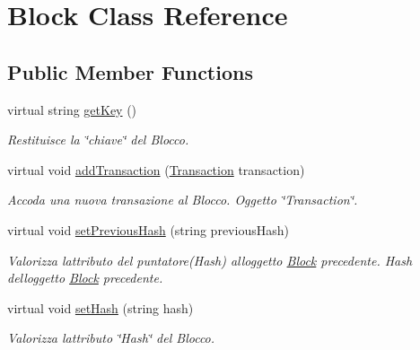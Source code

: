 \hypertarget{class_block}{}\section{Block Class Reference}
\label{class_block}
\subsection*{Public Member Functions}
\begin{DoxyCompactItemize}
\item 
virtual string \mbox{\hyperlink{class_block_ab2a9d794f7f9ee273c5dafe349dfc8ef}{get\+Key}} ()
\begin{DoxyCompactList}\small\item\em Restituisce la \char`\"{}chiave\char`\"{} del Blocco. \end{DoxyCompactList}\item 
\mbox{\label{class_block_aceac7c0fb82807837b429bc004418cc2}} 
virtual void \mbox{\hyperlink{class_block_aceac7c0fb82807837b429bc004418cc2}{add\+Transaction}} (\mbox{\hyperlink{class_transaction}{Transaction}} transaction)
\begin{DoxyCompactList}\small\item\em Accoda una nuova transazione al Blocco.  Oggetto \char`\"{}\+Transaction\char`\"{}. \end{DoxyCompactList}\item 
\mbox{\label{class_block_ae3fbc8bbaaa3eb6fa252dc321a2a4119}} 
virtual void \mbox{\hyperlink{class_block_ae3fbc8bbaaa3eb6fa252dc321a2a4119}{set\+Previous\+Hash}} (string previous\+Hash)
\begin{DoxyCompactList}\small\item\em Valorizza l\textquotesingle{}attributo del puntatore(\+Hash) all\textquotesingle{}oggetto \mbox{\hyperlink{class_block}{Block}} precedente.  Hash dell\textquotesingle{}oggetto \mbox{\hyperlink{class_block}{Block}} precedente. \end{DoxyCompactList}\item 
virtual void \mbox{\hyperlink{class_block_a156d082db99981b4710e00bec0ce7a59}{set\+Hash}} (string hash)
\begin{DoxyCompactList}\small\item\em Valorizza l\textquotesingle{}attributo \char`\"{}\+Hash\char`\"{} del Blocco. \end{DoxyCompactList}\item 

\end{DoxyCompactItemize}
